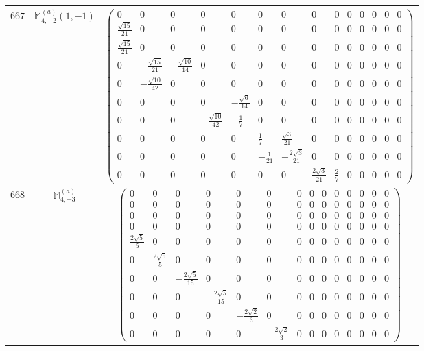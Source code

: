 \documentclass[fleqn,8pt,landscape]{jsarticle}
\begin{document}
\begin{center}
\begin{longtable}{ccc}
$ 667 $ & $ \mathbb{M}_{4,-2}^{(a)}(1,-1) $ & $ \begin{pmatrix} 0 & 0 & 0 & 0 & 0 & 0 & 0 & 0 & 0 & 0 & 0 & 0 & 0 & 0 \\ \frac{\sqrt{15}}{21} & 0 & 0 & 0 & 0 & 0 & 0 & 0 & 0 & 0 & 0 & 0 & 0 & 0 \\ \frac{\sqrt{15}}{21} & 0 & 0 & 0 & 0 & 0 & 0 & 0 & 0 & 0 & 0 & 0 & 0 & 0 \\ 0 & - \frac{\sqrt{15}}{21} & - \frac{\sqrt{10}}{14} & 0 & 0 & 0 & 0 & 0 & 0 & 0 & 0 & 0 & 0 & 0 \\ 0 & - \frac{\sqrt{10}}{42} & 0 & 0 & 0 & 0 & 0 & 0 & 0 & 0 & 0 & 0 & 0 & 0 \\ 0 & 0 & 0 & 0 & - \frac{\sqrt{6}}{14} & 0 & 0 & 0 & 0 & 0 & 0 & 0 & 0 & 0 \\ 0 & 0 & 0 & - \frac{\sqrt{10}}{42} & - \frac{1}{7} & 0 & 0 & 0 & 0 & 0 & 0 & 0 & 0 & 0 \\ 0 & 0 & 0 & 0 & 0 & \frac{1}{7} & \frac{\sqrt{3}}{21} & 0 & 0 & 0 & 0 & 0 & 0 & 0 \\ 0 & 0 & 0 & 0 & 0 & - \frac{1}{21} & - \frac{2 \sqrt{3}}{21} & 0 & 0 & 0 & 0 & 0 & 0 & 0 \\ 0 & 0 & 0 & 0 & 0 & 0 & 0 & \frac{2 \sqrt{3}}{21} & \frac{2}{7} & 0 & 0 & 0 & 0 & 0 \end{pmatrix} $ \\ \hline
$ 668 $ & $ \mathbb{M}_{4,-3}^{(a)} $ & $ \begin{pmatrix} 0 & 0 & 0 & 0 & 0 & 0 & 0 & 0 & 0 & 0 & 0 & 0 & 0 & 0 \\ 0 & 0 & 0 & 0 & 0 & 0 & 0 & 0 & 0 & 0 & 0 & 0 & 0 & 0 \\ 0 & 0 & 0 & 0 & 0 & 0 & 0 & 0 & 0 & 0 & 0 & 0 & 0 & 0 \\ 0 & 0 & 0 & 0 & 0 & 0 & 0 & 0 & 0 & 0 & 0 & 0 & 0 & 0 \\ \frac{2 \sqrt{5}}{5} & 0 & 0 & 0 & 0 & 0 & 0 & 0 & 0 & 0 & 0 & 0 & 0 & 0 \\ 0 & \frac{2 \sqrt{5}}{5} & 0 & 0 & 0 & 0 & 0 & 0 & 0 & 0 & 0 & 0 & 0 & 0 \\ 0 & 0 & - \frac{2 \sqrt{5}}{15} & 0 & 0 & 0 & 0 & 0 & 0 & 0 & 0 & 0 & 0 & 0 \\ 0 & 0 & 0 & - \frac{2 \sqrt{5}}{15} & 0 & 0 & 0 & 0 & 0 & 0 & 0 & 0 & 0 & 0 \\ 0 & 0 & 0 & 0 & - \frac{2 \sqrt{2}}{3} & 0 & 0 & 0 & 0 & 0 & 0 & 0 & 0 & 0 \\ 0 & 0 & 0 & 0 & 0 & - \frac{2 \sqrt{2}}{3} & 0 & 0 & 0 & 0 & 0 & 0 & 0 & 0 \end{pmatrix} $ \\ \hline

\end{longtable}
\end{center}
\end{document}
